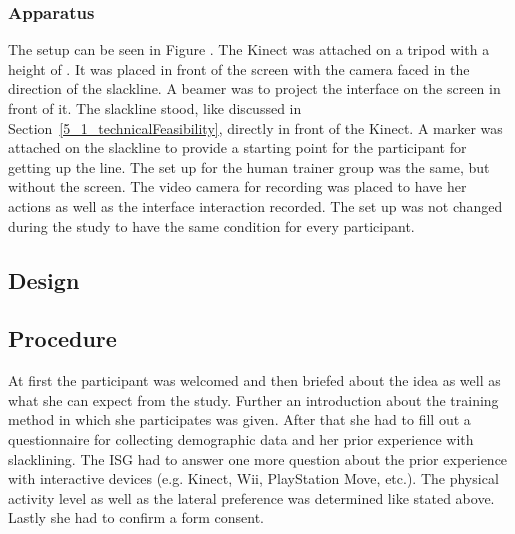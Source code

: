 \subsubsection{Apparatus}
The setup can be seen in Figure \todo{[figure]}. The Kinect was attached on a tripod with a height of \todo{90 cm}. It was placed in front of the screen with the camera faced in the direction of the slackline. A beamer was  to project the interface on the screen in front of it. The slackline stood, like discussed in Section~\ref{5_1_technicalFeasibility}, directly in front of the Kinect. A marker was attached on the slackline to provide a starting point for the participant for getting up the line.
The set up for the human trainer group was the same, but without the screen. The video camera for recording was placed  to have her actions as well as the interface interaction recorded. The set up was not changed during the study to have the same condition for every participant.

\todo{[Figure]}

\subsection{Design}

\subsection{Procedure}
At first the participant was welcomed and then briefed about the idea as well as what she can expect from the study. Further an introduction about the training method in which she participates was given. After that she had to fill out a questionnaire for collecting demographic data and her prior experience with slacklining. The ISG had to answer one more question about the prior experience with interactive devices (e.g. Kinect, Wii, PlayStation Move, etc.).
The physical activity level as well as the lateral preference was determined like stated above. Lastly she had to confirm a form consent.


